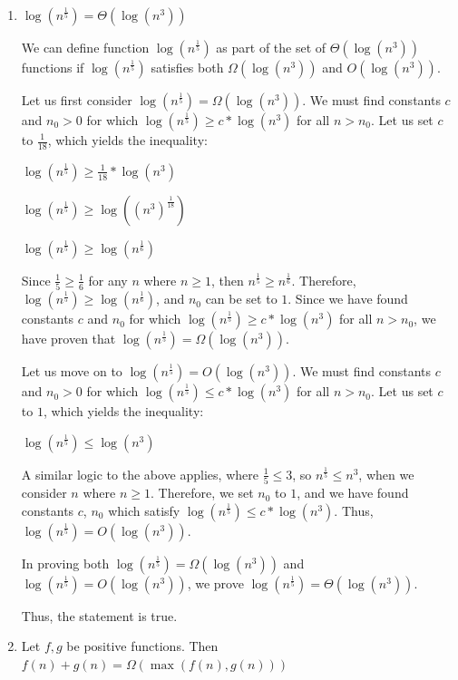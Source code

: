 \documentclass[11pt]{article}
\begin{document}
\begin{enumerate}
Therefore, the statement is true.

\item $\log(n^{\frac{1}{5}}) = \Theta(\log (n^{3}))$

We can define function $\log(n^{\frac{1}{5}})$ as part of the set of $\Theta(\log (n^{3}))$ functions if $\log(n^{\frac{1}{5}})$ satisfies both $\Omega(\log (n^{3}))$ and $O(\log (n^{3}))$. 

Let us first consider $\log(n^{\frac{1}{5}}) = \Omega(\log (n^{3}))$. We must find constants $c$ and $n_0 > 0$ for which $\log(n^{\frac{1}{5}}) \geq c * \log (n^{3})$ for all $n > n_0$. 
Let us set $c$ to $\frac{1}{18}$, which yields the inequality:

$\log(n^{\frac{1}{5}}) \geq \frac{1}{18} * \log (n^{3})$

$\log(n^{\frac{1}{5}}) \geq  \log ((n^{3})^{\frac{1}{18}})$

$\log(n^{\frac{1}{5}}) \geq  \log (n^{\frac{1}{6}})$

Since $\frac{1}{5} \geq \frac{1}{6}$ for any $n$ where $n \geq 1$, then $n^{\frac{1}{5}} \geq n^{\frac{1}{6}}$. 
Therefore, $\log(n^{\frac{1}{5}}) \geq  \log (n^{\frac{1}{6}})$, and $n_0$ can be set to $1$. 
Since we have found constants $c$ and $n_0$ for which  $\log(n^{\frac{1}{5}}) \geq c * \log (n^{3})$ for all $n > n_0$, we have proven that $\log(n^{\frac{1}{5}}) = \Omega(\log (n^{3}))$.

Let us move on to $\log(n^{\frac{1}{5}}) = O(\log (n^{3}))$. We must find constants $c$ and $n_0 > 0$ for which $\log(n^{\frac{1}{5}}) \leq c * \log (n^{3})$ for all $n > n_0$. 
Let us set $c$ to $1$, which yields the inequality:

$\log(n^{\frac{1}{5}}) \leq \log (n^{3})$

A similar logic to the above applies, where $\frac{1}{5} \leq 3$, so $n^{\frac{1}{5}} \leq n^{3}$, when we consider $n$ where $n \geq 1$. 
Therefore, we set $n_0$ to $1$, and we have found constants $c$, $n_0$ which satisfy $\log(n^{\frac{1}{5}}) \leq c * \log (n^{3})$. 
Thus, $\log(n^{\frac{1}{5}}) = O(\log (n^{3}))$.

In proving both $\log(n^{\frac{1}{5}}) = \Omega(\log (n^{3}))$ and $\log(n^{\frac{1}{5}}) = O(\log (n^{3}))$, we prove $\log(n^{\frac{1}{5}}) = \Theta(\log (n^{3}))$. 

Thus, the statement is true.

\item Let $f,g$ be positive functions. Then $f(n)+g(n) = \Omega(\max(f(n),g(n)))$


\end{enumerate}
\end{document}
